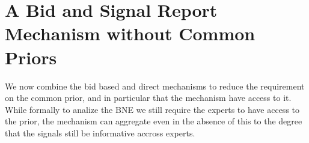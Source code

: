 










\section{A Bid and Signal Report Mechanism without Common Priors}

We now combine the bid based and direct mechanisms to reduce the requirement on the common prior, and in particular that the mechanism have access to it. While formally to analize the BNE we still require the experts to have access to the prior, the mechanism can aggregate even in the absence of this to the degree that the signals still be informative accross experts. 

